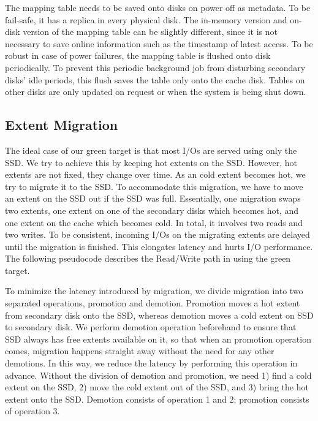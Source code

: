 The mapping table needs to be saved onto disks on power off as
metadata. To be fail-safe, it has a replica in every physical disk.
The in-memory version and on-disk version of the mapping table can be
slightly different, since it is not necessary to save online
information such as the timestamp of latest access. To be robust in
case of power failures, the mapping table is flushed onto disk
periodically. To prevent this periodic background job from disturbing
secondary disks' idle periods, this flush saves the table only onto
the cache disk. Tables on other disks are only updated on request or
when the system is being shut down.


\subsection{Extent Migration}\label{sec:migrate}

The ideal case of our green target is that most I/Os are served using
only the SSD. We try to achieve this by keeping hot extents on the
SSD. However, hot extents are not fixed, they change over time. As an
cold extent becomes hot, we try to migrate it to the SSD. To
accommodate this migration, we have to move an extent on the SSD out if
the SSD was full. Essentially, one migration swaps two extents, one 
extent on one of the secondary disks which becomes hot, and one extent 
on the cache which becomes cold. In total, it involves two reads and 
two writes. To be consistent, incoming I/Os on the migrating extents 
are delayed until the migration is finished.  This elongates latency 
and hurts I/O performance. The following pseudocode describes the 
Read/Write path in using the green target.

To minimize the latency introduced by migration, we divide migration
into two separated operations, promotion and demotion. Promotion moves 
a hot extent from secondary disk onto the SSD, whereas demotion moves 
a cold extent on SSD to secondary disk. We perform demotion operation 
beforehand to ensure that SSD always has free extents available on it,
so that when an promotion operation comes, migration happens straight
away without the need for any other demotions.  In this way, we reduce 
the latency by performing this operation in advance.  Without the division
of demotion and promotion, we need 1) find a cold extent on the SSD,
2) move the cold extent out of the SSD, and 3) bring the hot extent
onto the SSD.  Demotion consists of operation 1 and 2; promotion
consists of operation 3.  

